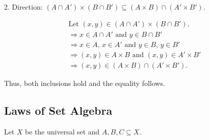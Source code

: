2. Direction: \((A \cap A') \times (B \cap B') \subseteq (A \times B) \cap (A' \times B')\).

\begin{align*}
	&\text{Let } (x,y) \in (A \cap A') \times (B \cap B'). \\
	&\Rightarrow x \in A \cap A' \text{ and } y \in B \cap B' \\
	&\Rightarrow x \in A,\, x \in A' \text{ and } y \in B,\, y \in B' \\
	&\Rightarrow (x,y) \in A \times B \text{ and } (x,y) \in A' \times B' \\
	&\Rightarrow (x,y) \in (A \times B) \cap (A' \times B').
\end{align*}

Thus, both inclusions hold and the equality follows.

\QED 

\subsection{Laws of Set Algebra}

Let \(X\) be the universal set and \(A, B, C \subseteq X\).

